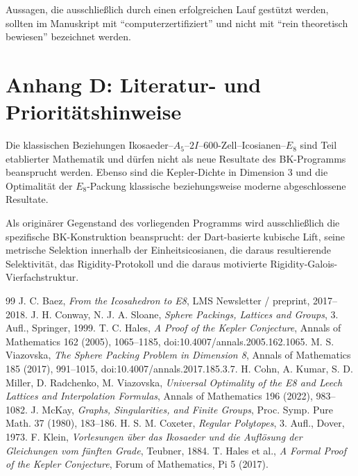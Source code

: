 \documentclass[11pt,a4paper]{article}
\theoremstyle{definition}
\theoremstyle{remark}
\begin{document}
Aussagen, die ausschließlich durch einen erfolgreichen Lauf gestützt werden, sollten im Manuskript mit ``computerzertifiziert'' und nicht mit ``rein theoretisch bewiesen'' bezeichnet werden.

\section{Anhang D: Literatur- und Prioritätshinweise}
Die klassischen Beziehungen Ikosaeder--$A_5$--$2I$--600-Zell--Icosianen--$E_8$ sind Teil etablierter Mathematik und dürfen nicht als neue Resultate des BK-Programms beansprucht werden. Ebenso sind die Kepler-Dichte in Dimension 3 und die Optimalität der $E_8$-Packung klassische beziehungsweise moderne abgeschlossene Resultate.

Als originärer Gegenstand des vorliegenden Programms wird ausschließlich die spezifische BK-Konstruktion beansprucht: der Dart-basierte kubische Lift, seine metrische Selektion innerhalb der Einheitsicosianen, die daraus resultierende Selektivität, das Rigidity-Protokoll und die daraus motivierte Rigidity-Galois-Vierfachstruktur.

\begin{thebibliography}{99}
 J. C. Baez, \emph{From the Icosahedron to E8}, LMS Newsletter / preprint, 2017--2018.
 J. H. Conway, N. J. A. Sloane, \emph{Sphere Packings, Lattices and Groups}, 3. Aufl., Springer, 1999.
 T. C. Hales, \emph{A Proof of the Kepler Conjecture}, Annals of Mathematics 162 (2005), 1065--1185, doi:10.4007/annals.2005.162.1065.
 M. S. Viazovska, \emph{The Sphere Packing Problem in Dimension 8}, Annals of Mathematics 185 (2017), 991--1015, doi:10.4007/annals.2017.185.3.7.
 H. Cohn, A. Kumar, S. D. Miller, D. Radchenko, M. Viazovska, \emph{Universal Optimality of the E8 and Leech Lattices and Interpolation Formulas}, Annals of Mathematics 196 (2022), 983--1082.
 J. McKay, \emph{Graphs, Singularities, and Finite Groups}, Proc. Symp. Pure Math. 37 (1980), 183--186.
 H. S. M. Coxeter, \emph{Regular Polytopes}, 3. Aufl., Dover, 1973.
 F. Klein, \emph{Vorlesungen über das Ikosaeder und die Auflösung der Gleichungen vom fünften Grade}, Teubner, 1884.
 T. Hales et al., \emph{A Formal Proof of the Kepler Conjecture}, Forum of Mathematics, Pi 5 (2017).
\end{thebibliography}
\end{document}

